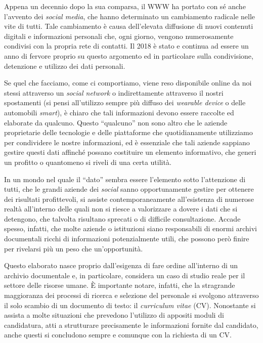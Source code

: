 \vspace{1em}

Appena un decennio dopo la sua comparsa, il WWW ha portato con sé anche l’avvento dei \textit{social media}, che hanno determinato un cambiamento radicale nelle vite di tutti. Tale cambiamento è causa dell’elevata diffusione di nuovi contenuti digitali e informazioni personali che, ogni giorno, vengono numerosamente condivisi con la propria rete di contatti. Il 2018 è stato e continua ad essere un anno di fervore proprio su questo argomento ed in particolare sulla condivisione, detenzione e utilizzo dei dati personali. 

Se quel che facciamo, come ci comportiamo, viene reso disponibile online da noi stessi attraverso un \textit{social network} o indirettamente attraverso il nostri spostamenti (si pensi all’utilizzo sempre più diffuso dei \textit{wearable device} o delle automobili \textit{smart}), è chiaro che tali informazioni devono essere raccolte ed elaborate da qualcuno. Questo “qualcuno” non sono altro che le aziende proprietarie delle tecnologie e delle piattaforme che quotidianamente utilizziamo per condividere le nostre informazioni, ed è essenziale che tali aziende sappiano gestire questi dati affinché possano costituire un elemento informativo, che generi un profitto o quantomeno si riveli di una certa utilità.

\vspace{1\baselineskip}

In un mondo nel quale il “dato” sembra essere l'elemento sotto l’attenzione di tutti, che le grandi aziende dei \textit{social} sanno opportunamente gestire per ottenere dei risultati profittevoli, si assiste contemporaneamente all’esistenza di numerose realtà all’interno delle quali non si riesce a valorizzare a dovere i dati che si detengono, che talvolta risultano sprecati o di difficile consultazione. Accade spesso, infatti, che molte aziende o istituzioni siano responsabili di enormi archivi documentali ricchi di informazioni potenzialmente utili, che possono però finire per rivelarsi più un peso che un’opportunità.

Questo elaborato nasce proprio dall’esigenza di fare ordine all’interno di un archivio documentale e, in particolare, considera un caso di studio reale per il settore delle risorse umane. È importante notare, infatti, che la stragrande maggioranza dei processi di ricerca e selezione del personale si svolgono attraverso il solo scambio di un documento di testo: il \textit{curriculum vitae} (CV). Nonostante si assista a molte situazioni che prevedono l’utilizzo di appositi moduli di candidatura, atti a strutturare precisamente le informazioni fornite dal candidato, anche questi si concludono sempre e comunque con la richiesta di un CV. 

